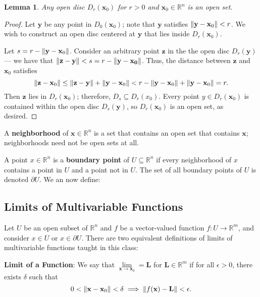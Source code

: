 \documentclass[11pt]{article}
\newtheorem*{lemma*}{Lemma}
\renewcommand{\vec}[1]{\mathbf{#1}}
\begin{document}
\begin{adjustwidth}{1cm}{}
	\begin{lemma*}
		Any open disc $D_{r}(\vec{x}_{0})$ for $r > 0$ and $\vec{x}_{0} \in \mathbb{R}^{n}$ is an open set.
	\end{lemma*}
    \begin{proof}\renewcommand{\qedsymbol}{}
		Let $\vec{y}$ be any point in $D_{0}(\vec{x}_{0})$; note that $\vec{y}$ satisfies $\norm{\vec{y} - \vec{x}_{0}} < r$. We wish to construct an open disc centered at  $\vec{y}$ that lies inside $D_{r} (\vec{x}_{0})$.

		Let $s = r - \norm{\vec{y} - \vec{x}_{0}}$. Consider an arbitrary point $\vec{z}$ in the the open disc $D_{r} (\vec{y})$ --- we have that $\norm{\vec{z} - \vec{y}} < s = r - \norm{\vec{y} - \vec{x_{0}}}$. Thus, the distance between $\vec{z}$ and $\vec{x}_{0}$ satisfies
		\[
			\norm{\vec{z} - \vec{x}_{0}} \leq \norm{\vec{z} - \vec{y}} + \norm{\vec{y} - \vec{x}_{0}} < r - \norm{\vec{y} - \vec{x}_{0}} + \norm{\vec{y} - \vec{x}_{0}} = r.
		\]
		Then $\vec{z}$ lies in $D_{r}(\vec{x}_{0})$; therefore, $D_{s} \subseteq D_{r} (x_{0})$. Every point $y \in D_{r}(\vec{x}_{0})$ is contained within the open disc $D_{s} (\vec{y})$, so $D_{r} (\vec{x}_{0})$ is an open set, as desired.
	\end{proof}
\end{adjustwidth}

A \textbf{neighborhood} of $\vec{x} \in \mathbb{R}^{n}$ is a set that contains an open set that contains $\vec{x}$; neighborhoods need not be open sets at all. 

A point $x \in \mathbb{R}^{n}$ is a \textbf{boundary point} of $U \subseteq \mathbb{R}^{n}$ if every neighborhood of $x$ contains a point in $U$ and a point not in $U$. The set of all boundary points of $U$ is denoted $\partial U$. We an now define:

\subsection{Limits of Multivariable Functions}

Let $U$ be an open subset of $\mathbb{R}^{n}$ and $f$ be a vector-valued function $f : U \to \mathbb{R}^{m}$, and consider $x \in U$ or $x \in \partial U$. There are two equivalent definitions of limits of multivariable functions taught in this class:

\textbf{Limit of a Function}: We say that $\lim\limits_{\vec{x} \to \vec{x}_{0}} = \vec{L}$ for $\vec{L} \in \mathbb{R}^{m}$ if for all $\epsilon > 0$, there exists $\delta$ such that 
\[
	0 < \norm{\vec{x} - \vec{x}_{0}} < \delta \implies \norm{f(\vec{x}) - \vec{L}} < \epsilon.
\]
\end{document}
